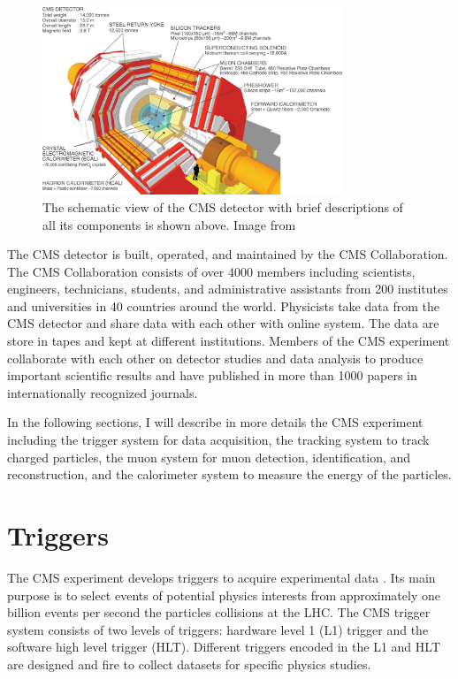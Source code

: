 \begin{figure}[hbtp]
\begin{center}
\includegraphics[width=0.80\textwidth]{Figures/Chapter2/CMSDecPic.jpg}
\caption{The schematic view of the CMS detector with brief descriptions of all its components is shown above. Image from \cite{HiggsCMS}}
\label{CMSDecPic}
\end{center}
\end{figure} 

The CMS detector is built, operated, and maintained by the CMS Collaboration. The CMS Collaboration consists of over 4000 members including scientists, engineers, technicians, students, and administrative assistants from 200 institutes and universities in 40 countries around the world. Physicists take data from the CMS detector and share data with each other with online system. The data are store in tapes and kept at different institutions. Members of the CMS experiment collaborate with each other on detector studies and data analysis to produce important scientific results and have published in more than 1000 papers in internationally recognized journals.

In the following sections, I will describe in more details the CMS experiment including the trigger system for data acquisition, the tracking system to track charged particles, the muon system for muon detection, identification, and reconstruction, and the calorimeter system to measure the energy of the particles.

\section{Triggers}

The CMS experiment develops triggers to acquire experimental data \cite{CMSTrigger}. Its main purpose is to select events of potential physics interests from approximately one billion events per second the particles collisions at the LHC. The CMS trigger system consists of two levels of triggers: hardware level 1 (L1) trigger and the software high level trigger (HLT). Different triggers encoded in the L1 and HLT are designed and fire to collect datasets for specific physics studies.


